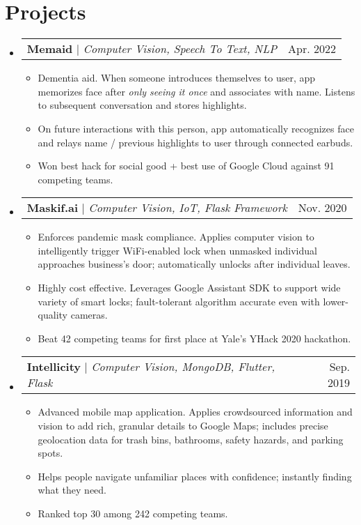 \documentclass[letterpaper,10pt]{article}
\makeatletter
\newcommand{\resumeItem}[1]{
  \item\small{
    {#1 \vspace{-2pt}}
  }
}
\newcommand{\resumeProjectHeading}[2]{
    \item
    \begin{tabular*}{0.97\textwidth}{l@{\extracolsep{\fill}}r}
      \small#1 & #2 \\
    \end{tabular*}\vspace{-7pt}
}
\newcommand{\resumeSubHeadingListStart}{\begin{itemize}[leftmargin=0.15in, label={}]}
\newcommand{\resumeSubHeadingListEnd}{\end{itemize}}
\newcommand{\resumeItemListStart}{\begin{itemize}}
\newcommand{\resumeItemListEnd}{\end{itemize}\vspace{-5pt}}
\makeatother
\begin{document}
\section{Projects}
    \resumeSubHeadingListStart
      \resumeProjectHeading
          {\textbf{Memaid} $|$ \emph{Computer Vision, Speech To Text, NLP}}{Apr. 2022}
          \resumeItemListStart
            \resumeItem{Dementia aid. When someone introduces themselves to user, app memorizes face after \textit{only seeing it once} and associates with name. Listens to subsequent conversation and stores highlights.}
            \resumeItem{On future interactions with this person, app automatically recognizes face and relays name / previous highlights to user through connected earbuds.}
            \resumeItem{Won best hack for social good + best use of Google Cloud against 91 competing teams.}
          \resumeItemListEnd
      \resumeProjectHeading
          {\textbf{Maskif.ai} $|$ \emph{Computer Vision, IoT, Flask Framework}}{Nov. 2020}
          \resumeItemListStart
            \resumeItem{Enforces pandemic mask compliance. Applies computer vision to intelligently trigger WiFi-enabled lock when unmasked individual approaches business's door; automatically unlocks after individual leaves.}
            \resumeItem{Highly cost effective. Leverages Google Assistant SDK to support wide variety of smart locks; fault-tolerant algorithm accurate even with lower-quality cameras.}
            \resumeItem{Beat 42 competing teams for first place at Yale's YHack 2020 hackathon.}
          \resumeItemListEnd
      \resumeProjectHeading
          {\textbf{Intellicity} $|$ \emph{Computer Vision, MongoDB, Flutter, Flask}}{Sep. 2019}
          \resumeItemListStart
            \resumeItem{Advanced mobile map application. Applies crowdsourced information and vision to add rich, granular details to Google Maps; includes precise geolocation data for trash bins, bathrooms, safety hazards, and parking spots.}
            \resumeItem{Helps people navigate unfamiliar places with confidence; instantly finding what they need.}
            \resumeItem{Ranked top 30 among 242 competing teams.}
          \resumeItemListEnd
    \resumeSubHeadingListEnd








\end{document}
